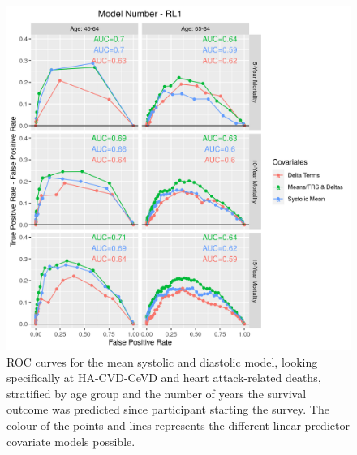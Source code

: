 \documentclass[
]{article}
\begin{document}
\begin{figure}
\hypertarget{fig:ROC_RL1}{%
\centering
\includegraphics{./Rmarkdown_Plots/ROC_CAx-Covariates_EventType_RL1.png}
\caption{ROC curves for the mean systolic and diastolic model, looking specifically at HA-CVD-CeVD and heart attack-related deaths, stratified by age group and the number of years the survival outcome was predicted since participant starting the survey. The colour of the points and lines represents the different linear predictor covariate models possible.}\label{fig:ROC_RL1}
}
\end{figure}
\end{document}
